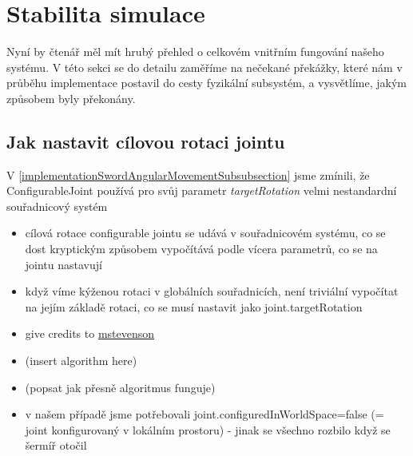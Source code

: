 \section{Stabilita simulace} \label{simulationStabilitySection}

Nyní by čtenář měl mít hrubý přehled o celkovém vnitřním fungování našeho systému. V této sekci se do detailu zaměříme na nečekané překážky, které nám v průběhu implementace postavil do cesty fyzikální subsystém, a vysvětlíme, jakým způsobem byly překonány.


\subsection{Jak nastavit cílovou rotaci jointu} \label{howToSetJointsTargetRotationSection}

V \ref{implementationSwordAngularMovementSubsubsection} jsme zmínili, že ConfigurableJoint používá pro svůj parametr \textit{targetRotation} velmi nestandardní souřadnicový systém



\pagebreak
\begin{itemize}
  \item cílová rotace configurable jointu se udává v souřadnicovém systému, co se dost kryptickým způsobem vypočítává podle vícera parametrů, co se na jointu nastavují
  \item když víme kýženou rotaci v globálních souřadnicích, není triviální vypočítat na jejím základě rotaci, co se musí nastavit jako joint.targetRotation
  \item give credits to \href{https://gist.github.com/mstevenson/4958837}{mstevenson}
  \item (insert algorithm here)
  \item (popsat jak přesně algoritmus funguje)
  \item v našem případě jsme potřebovali joint.configuredInWorldSpace=false (= joint konfigurovaný v lokálním prostoru) - jinak se všechno rozbilo když se šermíř otočil 
\end{itemize}

